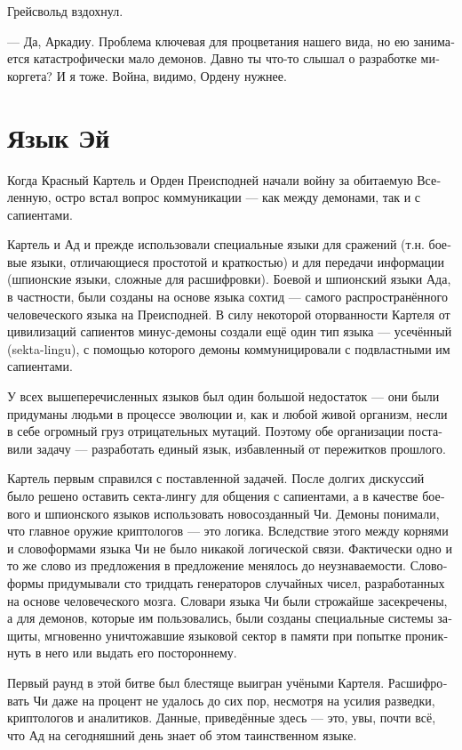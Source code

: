 \documentclass[a4paper,12pt,fleqn]{book}\usepackage{cooltooltips}\usepackage{polyglossia}\setdefaultlanguage[babelshorthands=true]{russian}\setotherlanguage{english}\defaultfontfeatures{Ligatures=TeX,Mapping=tex-text} \usepackage{xcolor}\definecolor{lightgray}{HTML}{bbbbbb}\color{lightgray}\newcommand{\ml}[3]{\textenglish{\textcolor{black}{#3}}}
\begin{document}
{Грейсвольд вздохнул.

--- Да, Аркадиу.
Проблема ключевая для процветания нашего вида, но ею занимается катастрофически мало демонов.
Давно ты что-то слышал о разработке микоргета?
И я тоже.
Война, видимо, Ордену нужнее.

\section{Язык Эй}

Когда Красный Картель и Орден Преисподней начали войну за обитаемую Вселенную, остро встал вопрос коммуникации --- как между демонами, так и с сапиентами.

Картель и Ад и прежде использовали специальные языки для сражений (т.н. боевые языки, отличающиеся простотой и краткостью) и для передачи информации (шпионские языки, сложные для расшифровки).
Боевой и шпионский языки Ада, в частности, были созданы на основе языка сохтид --- самого распространённого человеческого языка на Преисподней.
В силу некоторой оторванности Картеля от цивилизаций сапиентов минус-демоны создали ещё один тип языка --- усечённый (sekta-lingu), с помощью которого демоны коммуницировали с подвластными им сапиентами.

У всех вышеперечисленных языков был один большой недостаток --- они были придуманы людьми в процессе эволюции и, как и любой живой организм, несли в себе огромный груз отрицательных мутаций.
Поэтому обе организации поставили задачу --- разработать единый язык, избавленный от пережитков прошлого.

Картель первым справился с поставленной задачей.
После долгих дискуссий было решено оставить секта-лингу для общения с сапиентами, а в качестве боевого и шпионского языков использовать новосозданный Чи.
Демоны понимали, что главное оружие криптологов --- это логика.
Вследствие этого между корнями и словоформами языка Чи не было никакой логической связи.
Фактически одно и то же слово из предложения в предложение менялось до неузнаваемости.
Словоформы придумывали сто тридцать генераторов случайных чисел, разработанных на основе человеческого мозга.
Словари языка Чи были строжайше засекречены, а для демонов, которые им пользовались, были созданы специальные системы защиты, мгновенно уничтожавшие языковой сектор в памяти при попытке проникнуть в него или выдать его постороннему.

Первый раунд в этой битве был блестяще выигран учёными Картеля.
Расшифровать Чи даже на процент не удалось до сих пор, несмотря на усилия разведки, криптологов и аналитиков.
Данные, приведённые здесь --- это, увы, почти всё, что Ад на сегодняшний день знает об этом таинственном языке.

}
\end{document}
